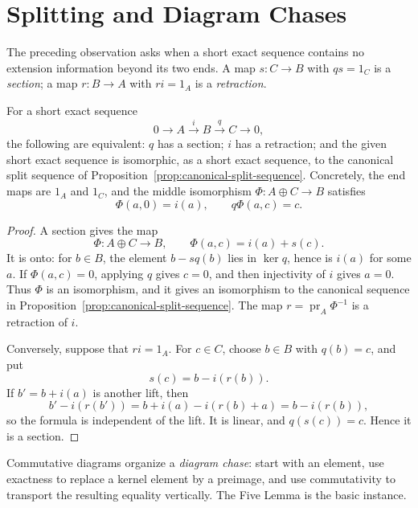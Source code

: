 \section{Splitting and Diagram Chases}
The preceding observation asks when a short exact sequence contains no
extension information beyond its two ends.  A map \(s:C\to B\) with
\(qs=1_C\) is a \emph{section}; a map \(r:B\to A\) with \(ri=1_A\) is a
\emph{retraction}.

\begin{theorem}\label{thm:splitting-lemma}
For a short exact sequence
\[
0\longrightarrow A\xrightarrow{i}B\xrightarrow{q}C\longrightarrow0,
\]
the following are equivalent: \(q\) has a section; \(i\) has a retraction;
and the given short exact sequence is isomorphic, as a short exact sequence,
to the canonical split sequence of
Proposition~\ref{prop:canonical-split-sequence}.  Concretely, the end maps
are \(1_A\) and \(1_C\), and the middle isomorphism
\(\Phi:A\oplus C\to B\) satisfies
\[
\Phi(a,0)=i(a),
\qquad
q\Phi(a,c)=c.
\]
\end{theorem}
\begin{proof}
A section gives the map
\[
\Phi:A\oplus C\longrightarrow B,\qquad
\Phi(a,c)=i(a)+s(c).
\]
It is onto: for \(b\in B\), the element \(b-sq(b)\) lies in \(\ker q\), hence
is \(i(a)\) for some \(a\).  If \(\Phi(a,c)=0\), applying \(q\) gives
\(c=0\), and then injectivity of \(i\) gives \(a=0\).  Thus \(\Phi\) is an
isomorphism, and it gives an isomorphism to the canonical sequence in
Proposition~\ref{prop:canonical-split-sequence}.  The map
\(r=\operatorname{pr}_A\Phi^{-1}\) is a retraction of \(i\).

Conversely, suppose that \(ri=1_A\).  For \(c\in C\), choose \(b\in B\) with
\(q(b)=c\), and put
\[
s(c)=b-i(r(b)).
\]
If \(b'=b+i(a)\) is another lift, then
\[
b'-i(r(b'))=b+i(a)-i(r(b)+a)=b-i(r(b)),
\]
so the formula is independent of the lift.  It is linear, and
\(q(s(c))=c\).  Hence it is a section.
\end{proof}

Commutative diagrams organize a \emph{diagram chase}: start with an element,
use exactness to replace a kernel element by a preimage, and use commutativity
to transport the resulting equality vertically.  The Five Lemma is the basic
instance.


